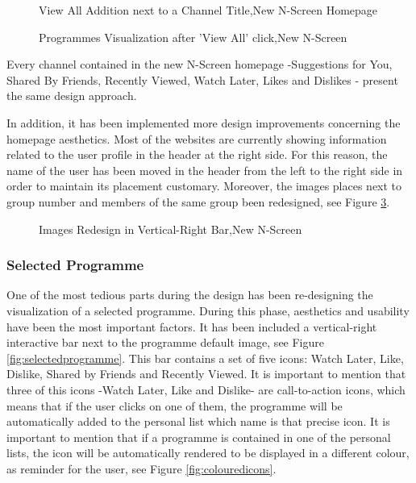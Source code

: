 \documentclass{acm_proc_article-sp}
\begin{document}
\begin{figure}[!htb]
\centering
{}
\caption{View All Addition next to a Channel Title,New N-Screen Homepage}
\label{fig:viewallzoom}
\end{figure}

\begin{figure}[!htb]
\centering
{}
\caption{Programmes Visualization after 'View All' click,New N-Screen}
\label{fig:viewallafter}
\end{figure}

Every channel contained in the new N-Screen homepage -Suggestions for You, Shared By Friends, Recently Viewed, Watch Later, Likes and Dislikes - present the same design approach. 

In addition, it has been implemented more design improvements concerning the homepage aesthetics. Most of the websites are currently showing information related to the user profile in the header at the right side\cite{colborne2010simple}\cite{krug2014don}\cite{norman2002design}. For this reason, the name of the user has been moved in the header from the left to the right side in order to maintain its placement customary. Moreover, the images places next to group number and members of the same group been redesigned, see Figure \ref{fig:roster}. 

\begin{figure}[!htb]
\centering
{}
\caption{Images Redesign in Vertical-Right Bar,New N-Screen}
\label{fig:roster}
\end{figure}

\subsubsection{Selected Programme}

One of the most tedious parts during the design has been re-designing the visualization of a selected programme. During this phase, aesthetics and usability have been the most important factors. It has been included a vertical-right interactive bar next to the programme default image, see Figure \ref{fig:selectedprogramme}. This bar contains a set of five icons: Watch Later, Like, Dislike, Shared by Friends and Recently Viewed. It is important to mention that three of this icons -Watch Later, Like and Dislike- are call-to-action icons, which means that if the user clicks on one of them, the programme will be automatically added to the personal list which name is that precise icon. It is important to mention that if a programme is contained in one of the personal lists, the icon will be automatically rendered to be displayed in a different colour, as reminder for the user, see Figure \ref{fig:colouredicons}. 
\end{document}
